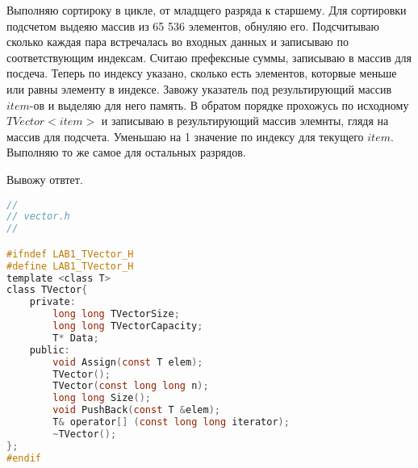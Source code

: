 Выполняю сортироку в цикле, от младщего разряда к старшему. Для сортировки подсчетом выдеяю массив из 65 536 элементов, обнуляю его. Подсчитываю сколько каждая пара встречалась во входных данных и записываю по соответствующим индексам. Считаю префексные суммы, записываю в массив для посдеча. Теперь по индексу указано, сколько есть элементов, которвые меньше или равны элементу в индексе. Завожу указатель под результирующий массив $item$-ов и выделяю для него память. В обратом порядке прохожусь по исходному $TVector<item>$ и записываю в результирующий массив элемнты, глядя на массив для подсчета. Уменьшаю на 1 значение по индексу для текущего $item$. Выполняю то же самое для остальных разрядов.

Вывожу отвтет.

\pagebreak
\begin{lstlisting}[language=C]
//
// vector.h
//

#ifndef LAB1_TVector_H
#define LAB1_TVector_H
template <class T>
class TVector{
    private:
        long long TVectorSize;
        long long TVectorCapacity;
        T* Data;
    public:
        void Assign(const T elem);
        TVector();
        TVector(const long long n);
        long long Size();
        void PushBack(const T &elem);
        T& operator[] (const long long iterator);
        ~TVector();
};
#endif
\end{lstlisting}

